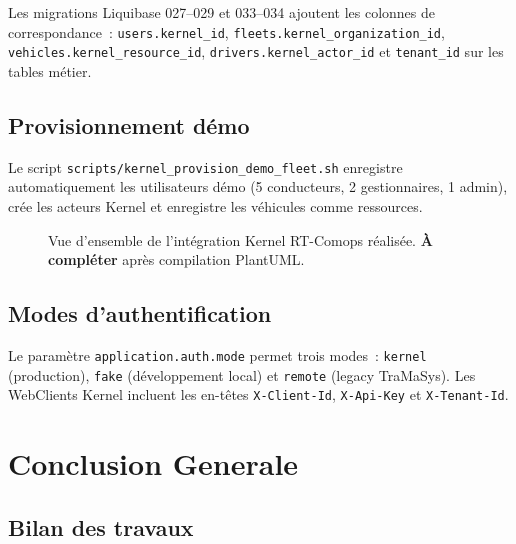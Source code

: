 \documentclass[12pt,a4paper]{report}
\begin{document}
\begin{enumerate}[leftmargin=2cm]
Les migrations Liquibase 027--029 et 033--034 ajoutent les colonnes de
correspondance~: \texttt{users.kernel\_id},
\texttt{fleets.kernel\_organization\_id}, \texttt{vehicles.kernel\_resource\_id},
\texttt{drivers.kernel\_actor\_id} et \texttt{tenant\_id} sur les tables métier.

\section{Provisionnement démo}

Le script \texttt{scripts/kernel\_provision\_demo\_fleet.sh} enregistre
automatiquement les utilisateurs démo (5 conducteurs, 2 gestionnaires, 1 admin),
crée les acteurs Kernel et enregistre les véhicules comme ressources.

\begin{figure}[H]
  \centering
  \caption{Vue d'ensemble de l'intégration Kernel RT-Comops réalisée.
           \textbf{À compléter} après compilation PlantUML.}
  \label{fig:kernel_integration}
\end{figure}

\section{Modes d'authentification}

Le paramètre \texttt{application.auth.mode} permet trois modes~:
\texttt{kernel} (production), \texttt{fake} (développement local) et
\texttt{remote} (legacy TraMaSys). Les WebClients Kernel incluent les en-têtes
\texttt{X-Client-Id}, \texttt{X-Api-Key} et \texttt{X-Tenant-Id}.

\chapter*{Conclusion Generale}
\thispagestyle{fancy}

\section*{Bilan des travaux}


\end{enumerate}
\end{document}
